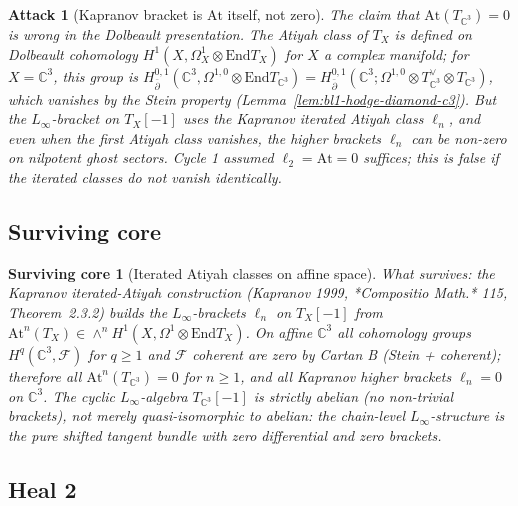 \documentclass[11pt]{article}
\newtheorem{attack}[theorem]{Attack}
\newtheorem{surviving}[theorem]{Surviving core}
\providecommand{\End}{\mathrm{End}}
\providecommand{\cF}{\mathcal{F}}
\providecommand{\C}{\mathbb{C}}
\begin{document}
\begin{attack}[Kapranov bracket is $\mathrm{At}$ itself, not zero]
\label{attack:bl1-kapranov-at}
The claim that $\mathrm{At}(T_{\C^3}) = 0$ is wrong in the Dolbeault
presentation. The Atiyah class of $T_X$ is defined on Dolbeault
cohomology $H^1(X, \Omega^1_X \otimes \End T_X)$ for $X$ a complex
manifold; for $X = \C^3$, this group is
$H^{0,1}_{\bar\partial}(\C^3, \Omega^{1,0} \otimes \End T_{\C^3})
= H^{0,1}_{\bar\partial}(\C^3; \Omega^{1,0} \otimes T_{\C^3}^\vee \otimes
T_{\C^3})$, which vanishes by the Stein property
(Lemma~\ref{lem:bl1-hodge-diamond-c3}). But the \emph{$L_\infty$-bracket}
on $T_X[-1]$ uses the Kapranov iterated Atiyah class $\ell_n$, and
\emph{even when the first Atiyah class vanishes}, the higher brackets
$\ell_n$ can be non-zero on nilpotent ghost sectors. Cycle 1 assumed
$\ell_2 = \mathrm{At} = 0$ suffices; this is false if the iterated
classes do not vanish identically.
\end{attack}

\subsection{Surviving core}
\label{subsec:bl1-survive-2}

\begin{surviving}[Iterated Atiyah classes on affine space]
\label{survive:bl1-2}
What survives: the Kapranov iterated-Atiyah construction
(Kapranov 1999, *Compositio Math.* 115, Theorem~2.3.2) builds the
$L_\infty$-brackets $\ell_n$ on $T_X[-1]$ from $\mathrm{At}^n(T_X) \in
\wedge^n H^1(X, \Omega^1 \otimes \End T_X)$. On affine $\C^3$ all
cohomology groups $H^q(\C^3, \cF)$ for $q \geq 1$ and $\cF$ coherent
are zero by Cartan B (Stein + coherent); therefore all
$\mathrm{At}^n(T_{\C^3}) = 0$ for $n \geq 1$, and all Kapranov higher
brackets $\ell_n = 0$ on $\C^3$. The cyclic $L_\infty$-algebra
$T_{\C^3}[-1]$ is \emph{strictly abelian} (no non-trivial brackets),
not merely quasi-isomorphic to abelian: the chain-level
$L_\infty$-structure is the pure shifted tangent bundle with zero
differential and zero brackets.
\end{surviving}

\subsection{Heal 2}
\label{subsec:bl1-heal-2}
\end{document}
